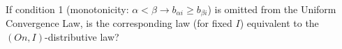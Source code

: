 If condition 1 (monotonicity: $\alpha < \beta \rightarrow b_{\alpha i} \geq b_{\beta i}$) is omitted from the Uniform Convergence Law, is the corresponding law (for fixed $I$) equivalent to the $(On, I)$-distributive law?
